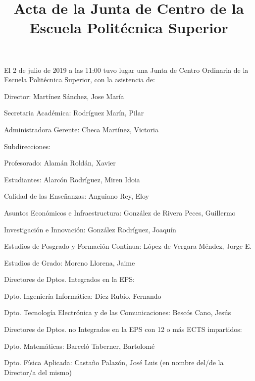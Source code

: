 \documentclass[numerado]{plantillasEPS} %
\title{Acta de la Junta de Centro de la Escuela Politécnica Superior} %
\begin{document}
El 2 de julio de 2019 a las 11:00 tuvo lugar una Junta de Centro Ordinaria de la Escuela Politécnica Superior, con la asistencia de: 


\begin{asisten}
    \item[Director:] Martínez Sánchez, Jose María
    \item[Secretaria Académica:] Rodríguez Marín, Pilar
    \item[Administradora Gerente:] Checa Martínez, Victoria
    
    \item[Subdirecciones:] 
    \begin{asisten}
        \item[Profesorado:] Alamán Roldán, Xavier
        \item[Estudiantes:] Alarcón Rodríguez, Miren Idoia
        \item[Calidad de las Enseñanzas:] Anguiano Rey, Eloy
        \item[Asuntos Económicos e Infraestructura:] González de Rivera Peces, Guillermo
        \item[Investigación e Innovación:] González Rodríguez, Joaquín
        \item[Estudios de Posgrado y Formación Continua:] López de Vergara Méndez, Jorge E.
        \item[Estudios de Grado:] Moreno Llorena, Jaime
    \end{asisten} 
    \item[Directores de Dptos. Integrados en la EPS:] 
    \begin{asisten}
        \item[Dpto. Ingeniería Informática:] Díez Rubio, Fernando
        \item[Dpto. Tecnología Electrónica y de las Comunicaciones:] Bescós Cano, Jesús
    \end{asisten} 
    \item[Directores de Dptos. no Integrados en la EPS con 12 o más ECTS impartidos:] 
    \begin{asisten}
        \item[Dpto. Matemáticas:] Barceló Taberner, Bartolomé
        \item[Dpto. Física Aplicada:] Castaño Palazón, José Luis (en nombre del/de la Director/a del mismo)
    \end{asisten} 

\end{asisten}
\end{document}
